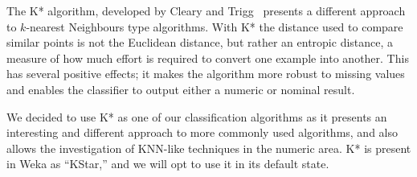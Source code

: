 \documentclass[../thesis/thesis.tex]{subfiles}
\begin{document}
The K* algorithm, developed by Cleary and Trigg~\cite{cleary1995k} presents a different approach to $k$-nearest Neighbours type algorithms. With K* the distance used to compare similar points is not the Euclidean distance, but rather an entropic distance, a measure of how much effort is required to convert one example into another. This has several positive effects; it makes the algorithm more robust to missing values and enables the classifier to output either a numeric or nominal result.

We decided to use K* as one of our classification algorithms as it presents an interesting and different approach to more commonly used algorithms, and also allows the investigation of KNN-like techniques in the numeric area. K* is present in Weka as ``KStar,'' and we will opt to use it in its default state.
\end{document}

